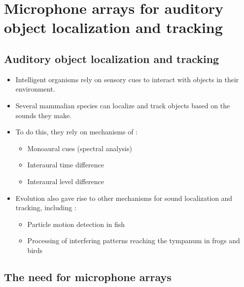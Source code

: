 \documentclass[14pt, oneside]{extarticle}
\begin{document}
\section{Microphone arrays for auditory object localization and tracking}

\subsection{Auditory object localization and tracking}

\begin{itemize}

\item Intelligent organisms rely on sensory cues to interact with objects in their environment. 

\item Several mammalian species can localize and track objects based on the sounds they make.

\item To do this, they rely on mechanisms of \cite{grothe2010mechanisms}:
	\begin{itemize}
	\item Monoaural cues (spectral analysis)
	\item Interaural time difference
	\item Interaural level difference
	\end{itemize}

\item Evolution also gave rise to other mechanisms for sound localization and tracking, including \cite{grothe2010mechanisms}: 
	\begin{itemize}
	\item Particle motion detection in fish 
	\item Processing of interfering patterns reaching the tympanum in frogs and birds
	\end{itemize}

\end{itemize}

\subsection{The need for microphone arrays}



\end{document}
